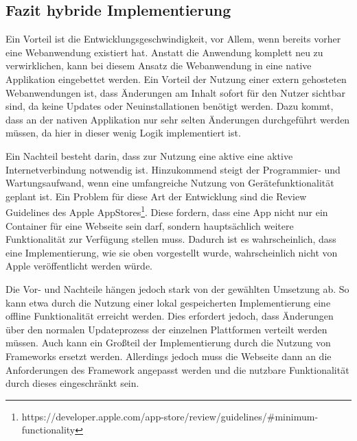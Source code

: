 \subsection{Fazit hybride Implementierung}
Ein Vorteil ist die Entwicklungsgeschwindigkeit, vor Allem, wenn bereits vorher eine Webanwendung existiert hat. Anstatt die Anwendung komplett neu zu verwirklichen, kann bei diesem Ansatz die Webanwendung in eine native Applikation eingebettet werden.
Ein Vorteil der Nutzung einer extern gehosteten Webanwendungen ist, dass Änderungen am Inhalt sofort für den Nutzer sichtbar sind, da keine Updates oder Neuinstallationen benötigt werden. 
Dazu kommt, dass an der nativen Applikation nur sehr selten Änderungen durchgeführt werden müssen, da hier in dieser wenig Logik implementiert ist.

Ein Nachteil besteht darin, dass zur Nutzung eine aktive eine aktive Internetverbindung notwendig ist. Hinzukommend steigt der Programmier- und Wartungsaufwand, wenn eine umfangreiche Nutzung von Gerätefunktionalität geplant ist. 
Ein Problem für diese Art der Entwicklung sind die Review Guidelines des Apple AppStores\footnote{https://developer.apple.com/app-store/review/guidelines/\#minimum-functionality}. 
Diese fordern, dass eine App nicht nur ein Container für eine Webseite sein darf, sondern hauptsächlich weitere Funktionalität zur Verfügung stellen muss. Dadurch ist es wahrscheinlich, dass eine Implementierung, wie sie oben vorgestellt wurde, wahrscheinlich nicht von Apple veröffentlicht werden würde.

Die Vor- und Nachteile hängen jedoch stark von der gewählten Umsetzung ab. So kann etwa durch die Nutzung einer lokal gespeicherten Implementierung eine offline Funktionalität erreicht werden. Dies erfordert jedoch, dass Änderungen über den normalen Updateprozess der einzelnen Plattformen verteilt werden müssen.
Auch kann ein Großteil der Implementierung durch die Nutzung von Frameworks ersetzt werden. Allerdings jedoch muss die Webseite dann an die Anforderungen des Framework angepasst werden und die nutzbare Funktionalität durch dieses eingeschränkt sein. 
